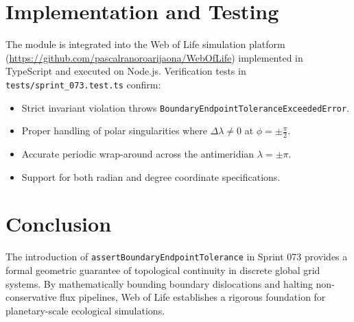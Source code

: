 \documentclass[11pt,a4paper]{article}
\begin{document}
\section{Implementation and Testing}
The module is integrated into the Web of Life simulation platform (\url{https://github.com/pascalranoroarijaona/WebOfLife}) implemented in TypeScript and executed on Node.js. Verification tests in \texttt{tests/sprint\_073.test.ts} confirm:
\begin{itemize}
    \item Strict invariant violation throws \texttt{BoundaryEndpointToleranceExceededError}.
    \item Proper handling of polar singularities where $\Delta\lambda \neq 0$ at $\phi = \pm \frac{\pi}{2}$.
    \item Accurate periodic wrap-around across the antimeridian $\lambda = \pm \pi$.
    \item Support for both radian and degree coordinate specifications.
\end{itemize}

\section{Conclusion}
The introduction of \texttt{assertBoundaryEndpointTolerance} in Sprint 073 provides a formal geometric guarantee of topological continuity in discrete global grid systems. By mathematically bounding boundary dislocations and halting non-conservative flux pipelines, Web of Life establishes a rigorous foundation for planetary-scale ecological simulations.
\end{document}
